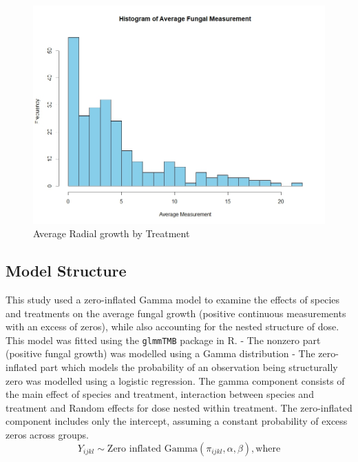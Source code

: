 \documentclass[
  10pt,
  letterpaper,
  twocolumn]{article}
\begin{document}
\begin{figure}

{\centering \includegraphics{Fig9.jpeg}

}

\caption{Average Radial growth by Treatment}

\end{figure}

\hypertarget{model-structure}{%
\subsection{Model Structure}\label{model-structure}}

\vspace{-1em}

This study used a zero-inflated Gamma model to examine the effects of
species and treatments on the average fungal growth (positive continuous
measurements with an excess of zeros), while also accounting for the
nested structure of dose. This model was fitted using the
\texttt{glmmTMB} package in R. - The nonzero part (positive fungal
growth) was modelled using a Gamma distribution - The zero-inflated part
which models the probability of an observation being structurally zero
was modelled using a logistic regression. The gamma component consists
of the main effect of species and treatment, interaction between species
and treatment and Random effects for dose nested within treatment. The
zero-inflated component includes only the intercept, assuming a constant
probability of excess zeros across groups. \begin{equation}
Y_{ijkl} \sim \text{Zero inflated Gamma} (\pi_{ijkl}, \alpha, \beta), \text{where}
\end{equation}
\end{document}
